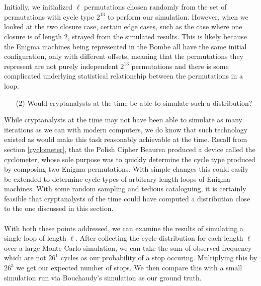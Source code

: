 \\\\Initially, we initialized $\ell$ permutations chosen randomly from the set of permutations with cycle type $2^{13}$ to perform our simulation. However, when we looked at the two closure case, certain edge cases, such as the case where one closure is of length $2$, strayed from the simulated results. This is likely because the Enigma machines being represented in the Bombe all have the same initial configuration, only with different offsets, meaning that the permutations they represent are not purely independent $2^{13}$ permutations and there is some complicated underlying statistical relationship between the permutations in a loop. 
\begin{enumerate}
	\item[(2)]Would cryptanalysts at the time be able to simulate such a distribution?
\end{enumerate}
While cryptanalysts at the time may not have been able to simulate as many iterations as we can with modern computers, we do know that such technology existed as would make this task reasonably achievable at the time. Recall from section \ref{cyclometer}, that the Polish Cipher Beaurea produced a device called the cyclometer, whose sole purpose was to quickly determine the cycle type produced by composing two Enigma permutations. With simple changes this could easily be extended to determine cycle types of arbitrary length loops of Enigma machines. With some random sampling and tedious cataloguing, it is certainly feasible that cryptanalysts of the time could have computed a distribution close to the one discussed in this section.
\\\\With both these points addressed, we can examine the results of simulating a single loop of length $\ell$. After collecting the cycle distribution for each length $\ell$ over a large Monte Carlo simulation, we can take the sum of observed frequency which are not $26^1$ cycles as our probability of a stop occuring. Multiplying this by $26^3$ we get our expected number of stops. We then compare this with a small simulation run via Bouchaudy's simulation as our ground truth. 

